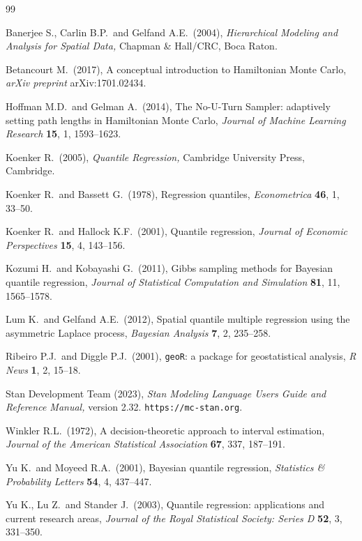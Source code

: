 \documentclass[twoside]{article}
\numberwithin{equation}{section}
\begin{document}
	\begin{thebibliography}{99}
		
		Banerjee S., Carlin B.P.\ and Gelfand A.E.\ (2004),
		{\it Hierarchical Modeling and Analysis for Spatial Data,}
		Chapman \& Hall/CRC, Boca Raton.
		
		Betancourt M.\ (2017),
		A conceptual introduction to Hamiltonian Monte Carlo,
		{\it arXiv preprint} arXiv:1701.02434.
		
		Hoffman M.D.\ and Gelman A.\ (2014),
		The No-U-Turn Sampler: adaptively setting path lengths in Hamiltonian
		Monte Carlo,
		{\it Journal of Machine Learning Research} \textbf{15}, 1, 1593--1623.
		
		Koenker R.\ (2005),
		{\it Quantile Regression,}
		Cambridge University Press, Cambridge.
		
		Koenker R.\ and Bassett G.\ (1978),
		Regression quantiles,
		{\it Econometrica} \textbf{46}, 1, 33--50.
		
		Koenker R.\ and Hallock K.F.\ (2001),
		Quantile regression,
		{\it Journal of Economic Perspectives} \textbf{15}, 4, 143--156.
		
		Kozumi H.\ and Kobayashi G.\ (2011),
		Gibbs sampling methods for Bayesian quantile regression,
		{\it Journal of Statistical Computation and Simulation}
		\textbf{81}, 11, 1565--1578.
		
		Lum K.\ and Gelfand A.E.\ (2012),
		Spatial quantile multiple regression using the asymmetric Laplace process,
		{\it Bayesian Analysis} \textbf{7}, 2, 235--258.
		
		Ribeiro P.J.\ and Diggle P.J.\ (2001),
		\texttt{geoR}: a package for geostatistical analysis,
		{\it R News} \textbf{1}, 2, 15--18.
		
		Stan Development Team (2023),
		{\it Stan Modeling Language Users Guide and Reference Manual,}
		version 2.32. \texttt{https://mc-stan.org}.
		
		Winkler R.L.\ (1972),
		A decision-theoretic approach to interval estimation,
		{\it Journal of the American Statistical Association}
		\textbf{67}, 337, 187--191.
		
		Yu K.\ and Moyeed R.A.\ (2001),
		Bayesian quantile regression,
		{\it Statistics \& Probability Letters} \textbf{54}, 4, 437--447.
		
		Yu K., Lu Z.\ and Stander J.\ (2003),
		Quantile regression: applications and current research areas,
		{\it Journal of the Royal Statistical Society: Series D}
		\textbf{52}, 3, 331--350.
		
	\end{thebibliography}
	
\end{document}
